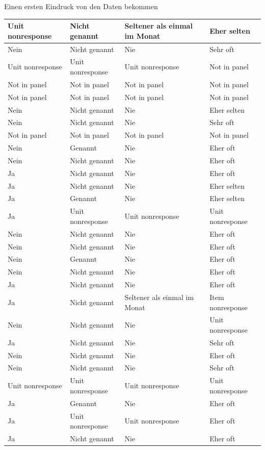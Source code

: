\documentclass[ignorenonframetext,]{beamer}
\begin{document}
\begin{frame}{Einen ersten Eindruck von den Daten bekommen}
\begin{tabular}{l|l|l|l}
\hline
Unit nonresponse & Nicht genannt & Seltener als einmal im Monat & Eher selten\\
\hline
Nein & Nicht genannt & Nie & Sehr oft\\
\hline
Unit nonresponse & Unit nonresponse & Unit nonresponse & Not in panel\\
\hline
Not in panel & Not in panel & Not in panel & Not in panel\\
\hline
Not in panel & Not in panel & Not in panel & Not in panel\\
\hline
Nein & Nicht genannt & Nie & Eher selten\\
\hline
Nein & Nicht genannt & Nie & Sehr oft\\
\hline
Not in panel & Not in panel & Not in panel & Not in panel\\
\hline
Nein & Genannt & Nie & Eher oft\\
\hline
Nein & Nicht genannt & Nie & Eher oft\\
\hline
Ja & Nicht genannt & Nie & Eher oft\\
\hline
Ja & Nicht genannt & Nie & Eher selten\\
\hline
Ja & Genannt & Nie & Eher selten\\
\hline
Ja & Unit nonresponse & Unit nonresponse & Unit nonresponse\\
\hline
Nein & Nicht genannt & Nie & Eher oft\\
\hline
Nein & Nicht genannt & Nie & Eher oft\\
\hline
Nein & Genannt & Nie & Eher oft\\
\hline
Nein & Nicht genannt & Nie & Eher oft\\
\hline
Ja & Nicht genannt & Nie & Eher oft\\
\hline
Ja & Nicht genannt & Seltener als einmal im Monat & Item nonresponse\\
\hline
Nein & Nicht genannt & Nie & Unit nonresponse\\
\hline
Ja & Nicht genannt & Nie & Sehr oft\\
\hline
Nein & Nicht genannt & Nie & Eher oft\\
\hline
Nein & Nicht genannt & Nie & Sehr oft\\
\hline
Unit nonresponse & Unit nonresponse & Unit nonresponse & Unit nonresponse\\
\hline
Ja & Genannt & Nie & Eher oft\\
\hline
Ja & Unit nonresponse & Unit nonresponse & Eher oft\\
\hline
Ja & Nicht genannt & Nie & Eher oft\\

\end{tabular}
\end{frame}
\end{document}

